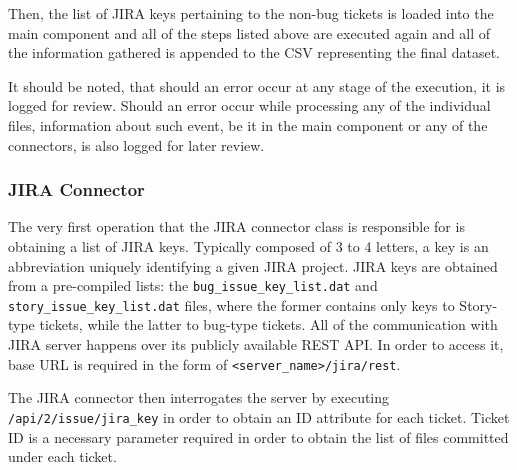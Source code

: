 Then, the list of JIRA keys pertaining to the non-bug tickets is loaded into the main component and all of the steps listed above are executed again and all of the information gathered is appended to the CSV representing the final dataset.

It should be noted, that should an error occur at any stage of the execution, it is logged for review. Should an error occur while processing any of the individual files, information about such event, be it in the main component or any of the connectors, is also logged for later review.

\subsubsection{JIRA Connector}\label{sec:source-code:jira}
The very first operation that the JIRA connector class is responsible for is obtaining a list of JIRA keys. Typically composed of 3 to 4 letters, a key is an abbreviation uniquely identifying a given JIRA project. JIRA keys are obtained from a pre-compiled lists: the \texttt{bug\_issue\_key\_list.dat} and \texttt{story\_issue\_key\_list.dat} files, where the former contains only keys to Story-type tickets, while the latter to bug-type tickets. 
All of the communication with JIRA server happens over its publicly available REST API. In order to access it, base URL is required in the form of \texttt{<server_name>/jira/rest}.

The JIRA connector then interrogates the server by executing \texttt{/api/2/issue/{jira_key}} in order to obtain an ID attribute for each ticket. Ticket ID is a necessary parameter required in order to obtain the list of files committed under each ticket.

